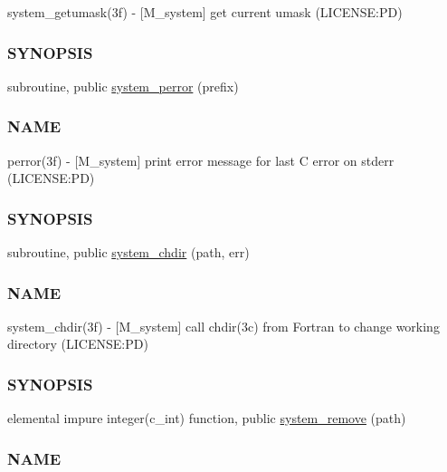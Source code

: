 \begin{DoxyCompactItemize}
\begin{DoxyCompactList}
system\+\_\+getumask(3f) -\/ \mbox{[}M\+\_\+system\mbox{]} get current umask (L\+I\+C\+E\+N\+SE\+:PD) \subsubsection*{S\+Y\+N\+O\+P\+S\+IS}\end{DoxyCompactList}\item 
subroutine, public \mbox{\hyperlink{namespacem__system_afae451a1fc5432274dc1f75a364051b4}{system\+\_\+perror}} (prefix)
\begin{DoxyCompactList}\small\item\em \subsubsection*{N\+A\+ME}

perror(3f) -\/ \mbox{[}M\+\_\+system\mbox{]} print error message for last C error on stderr (L\+I\+C\+E\+N\+SE\+:PD) \subsubsection*{S\+Y\+N\+O\+P\+S\+IS}\end{DoxyCompactList}\item 
subroutine, public \mbox{\hyperlink{namespacem__system_a47746b670cb21bae0957c9bb2bccf209}{system\+\_\+chdir}} (path, err)
\begin{DoxyCompactList}\small\item\em \subsubsection*{N\+A\+ME}

system\+\_\+chdir(3f) -\/ \mbox{[}M\+\_\+system\mbox{]} call chdir(3c) from Fortran to change working directory (L\+I\+C\+E\+N\+SE\+:PD) \subsubsection*{S\+Y\+N\+O\+P\+S\+IS}\end{DoxyCompactList}\item 
elemental impure integer(c\+\_\+int) function, public \mbox{\hyperlink{namespacem__system_a7fa10b991ae066609b687423918cff52}{system\+\_\+remove}} (path)
\begin{DoxyCompactList}\small\item\em \subsubsection*{N\+A\+ME}


\end{DoxyCompactList}
\end{DoxyCompactItemize}
